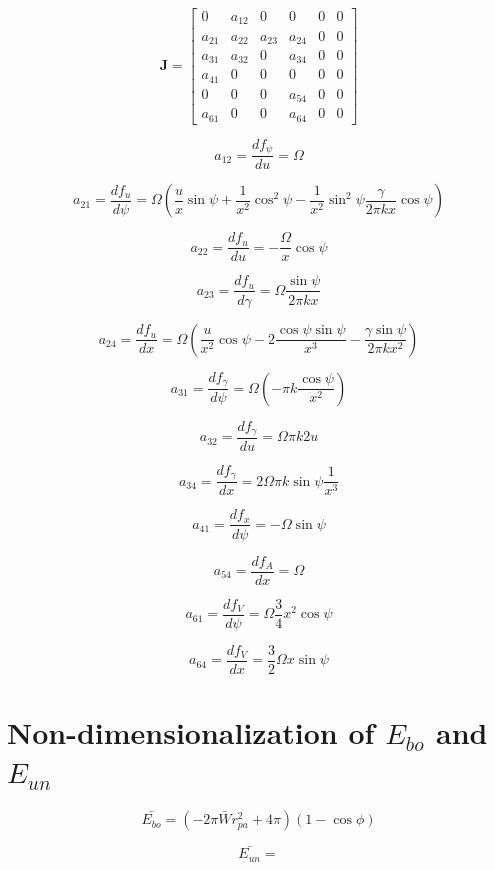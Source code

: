 \documentclass[12pt]{article}
\begin{document}
$$\mathbf{J} =%
\begin{bmatrix}
    0 & a_{12} & 0 & 0 & 0 & 0 \\[1ex]
    a_{21} & a_{22} & a_{23} & a_{24} & 0  & 0 \\[1ex]
    a_{31} & a_{32}& 0 & a_{34} & 0 & 0 \\[1ex]
    a_{41} & 0 & 0 & 0 & 0  & 0 \\[1ex]    
    0 & 0 & 0 &a_{54} & 0 & 0 \\[1ex]
    a_{61} & 0 & 0 & a_{64} & 0  & 0
  \end{bmatrix}
$$

$$
a_{12} = \frac{df_{\psi}}{du} = \Omega
$$

$$
a_{21} = \frac{df_{u}}{d\psi} = \Omega (\frac{u}{x} \sin \psi + \frac{1}{x^2} \cos^2 \psi - \frac{1}{x^2} \sin^2 \psi \frac{\gamma}{2 \pi k x } \cos \psi)
$$

$$
a_{22} = \frac{df_{u}}{du} = - \frac{\Omega}{x} \cos \psi
$$

$$
a_{23} = \frac{df_{u}}{d\gamma} = \Omega \frac{\sin \psi}{2 \pi k x}
$$

$$
a_{24} = \frac{df_{u}}{dx} = \Omega(\frac{u}{x^2}\cos \psi - 2\frac{\cos \psi \sin \psi}{x^3} - \frac{\gamma \sin \psi}{2 \pi k x^2})
$$

$$
a_{31} = \frac{df_{\gamma}}{d\psi} = \Omega (- \pi k \frac{\cos \psi}{x^2})
$$

$$
a_{32} = \frac{df_{\gamma}}{du} = \Omega \pi k 2 u
$$

$$
a_{34} = \frac{df_{\gamma}}{dx} = 2 \Omega \pi k \sin\psi \frac{1}{x^3}
$$

$$
a_{41} = \frac{df_{x}}{d\psi} = - \Omega \sin \psi
$$

$$
a_{54} = \frac{df_{A}}{dx} = \Omega
$$

$$
a_{61} = \frac{df_{V}}{d\psi} = \Omega \frac{3}{4} x^2 \cos \psi
$$

$$
a_{64} = \frac{df_{V}}{dx} = \frac{3}{2}\Omega x \sin \psi 
$$

\section{Non-dimensionalization of $E_{bo}$ and $E_{un}$}
$$
\bar{E_{bo}} = (-2 \pi \bar{W} r_{pa}^2 + 4 \pi)(1-\cos \phi)
$$

$$
\bar{E_{un}} = 
$$


\printbibliography
\end{document}
